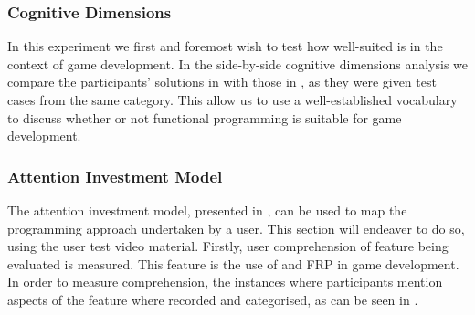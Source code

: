 \subsubsection{Cognitive Dimensions}
In this experiment we first and foremost wish to test how well-suited \fsh is in the context of game development. In the side-by-side cognitive dimensions analysis we compare the participants' solutions in \fsh with those in \csh, as they were given test cases from the same category. This allow us to use a well-established vocabulary to discuss whether or not functional programming is suitable for game development.

\begin{table}[H]
	\caption{Cognitive Dimensions Findings}
	\label{tab:cog-dim-findings}
\end{table}


\subsubsection{Attention Investment Model}
The attention investment model, presented in , can be used to map the programming approach undertaken by a user. This section will endeaver to do so, using the user test video material. Firstly, user comprehension of feature being evaluated is measured. This feature is the use of \fsh and \gls{FRP} in game development. In order to measure comprehension, the instances where participants mention aspects of the feature where recorded and categorised, as can be seen in .


